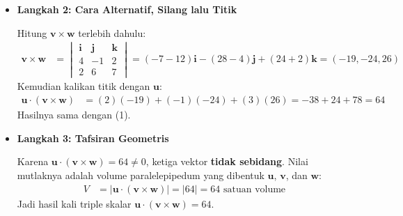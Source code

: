 \documentclass[10pt,a4paper]{article}
\newcounter{eqblock}
\newcommand{\reseteq}{%
  \stepcounter{eqblock}%
  \setcounter{equation}{0}%
  \renewcommand{\theHequation}{\arabic{eqblock}.\arabic{equation}}%
}
\begin{document}
\begin{enumerate}
\begin{itemize}
Triple skalar sama dengan determinan matriks yang baris-barisnya $\mathbf{u}$, $\mathbf{v}$, $\mathbf{w}$ (Bagian~8.2 Topik~11):
\reseteq
\begin{align}
\mathbf{u} \cdot (\mathbf{v} \times \mathbf{w}) &= \begin{vmatrix} 2 & -1 & 3 \\ 4 & -1 & 2 \\ 2 & 6 & 7 \end{vmatrix}
= 2\begin{vmatrix} -1 & 2 \\ 6 & 7 \end{vmatrix}
- (-1)\begin{vmatrix} 4 & 2 \\ 2 & 7 \end{vmatrix}
+ 3\begin{vmatrix} 4 & -1 \\ 2 & 6 \end{vmatrix} \nonumber \\
&= 2(-7 - 12) + 1(28 - 4) + 3(24 + 2) \nonumber \\
&= -38 + 24 + 78 = 64
\end{align}

\item \textbf{Langkah 2: Cara Alternatif, Silang lalu Titik}

Hitung $\mathbf{v} \times \mathbf{w}$ terlebih dahulu:
\begin{align}
\mathbf{v} \times \mathbf{w} &= \begin{vmatrix} \mathbf{i} & \mathbf{j} & \mathbf{k} \\ 4 & -1 & 2 \\ 2 & 6 & 7 \end{vmatrix}
= (-7 - 12)\mathbf{i} - (28 - 4)\mathbf{j} + (24 + 2)\mathbf{k} = (-19, -24, 26)
\end{align}
Kemudian kalikan titik dengan $\mathbf{u}$:
\begin{align}
\mathbf{u} \cdot (\mathbf{v} \times \mathbf{w}) &= (2)(-19) + (-1)(-24) + (3)(26) = -38 + 24 + 78 = 64
\end{align}
Hasilnya sama dengan (1).

\item \textbf{Langkah 3: Tafsiran Geometris}

Karena $\mathbf{u} \cdot (\mathbf{v} \times \mathbf{w}) = 64 \neq 0$, ketiga vektor \textbf{tidak sebidang}. Nilai mutlaknya adalah volume paralelepipedum yang dibentuk $\mathbf{u}$, $\mathbf{v}$, dan $\mathbf{w}$:
\begin{align}
V &= |\mathbf{u} \cdot (\mathbf{v} \times \mathbf{w})| = |64| = 64 \text{ satuan volume}
\end{align}
Jadi hasil kali triple skalar $\mathbf{u} \cdot (\mathbf{v} \times \mathbf{w}) = 64$.
\end{itemize}

\end{enumerate}
\end{document}
